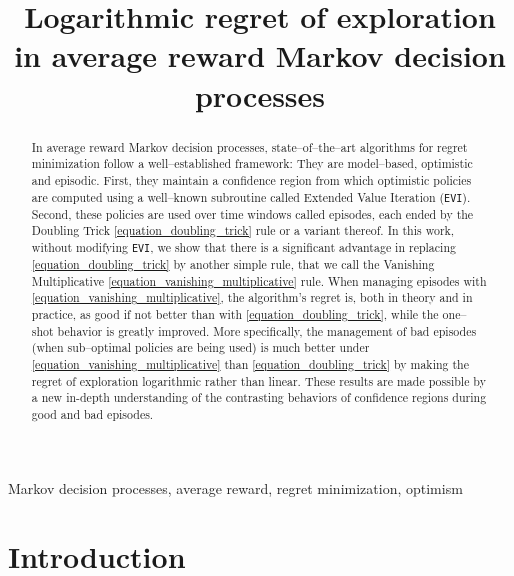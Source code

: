\documentclass[preprint,cleveref,12pt]{colt2025}
\title[Logarithmic regret of exploration in MDPs]{
    Logarithmic regret of exploration in average reward Markov decision processes
}
\begin{document}
    \allowdisplaybreaks %
    \maketitle

    \vspace{-2em} %
    
    \begin{abstract}%
        In average reward Markov decision processes, state--of--the--art algorithms for regret minimization follow a well--established framework:
        They are model--based, optimistic and episodic. 
        First, they maintain a confidence region from which optimistic policies are computed using a well--known subroutine called Extended Value Iteration (\texttt{EVI}).
        Second, these policies are used over time windows called episodes, each ended by the Doubling Trick \eqref{equation_doubling_trick} rule or a variant thereof.
        In this work, without modifying \texttt{EVI}, we show that there is a significant advantage in replacing \eqref{equation_doubling_trick} by another simple rule, that we call the Vanishing Multiplicative \eqref{equation_vanishing_multiplicative} rule.
        When managing episodes with \eqref{equation_vanishing_multiplicative}, the algorithm's regret is, both in theory and in practice, as good if not better than with \eqref{equation_doubling_trick}, while the one--shot behavior is greatly improved. 
        More specifically, the management of bad episodes (when sub--optimal policies are being used) is much better under \eqref{equation_vanishing_multiplicative} than \eqref{equation_doubling_trick} by making the regret of exploration logarithmic rather than linear.
        These results are made possible by a new in-depth understanding of the contrasting behaviors of confidence regions during good and bad episodes.
    \end{abstract}

    \begin{keywords}%
        Markov decision processes, average reward, regret minimization, optimism
    \end{keywords}

    \section{Introduction}
\end{document}

